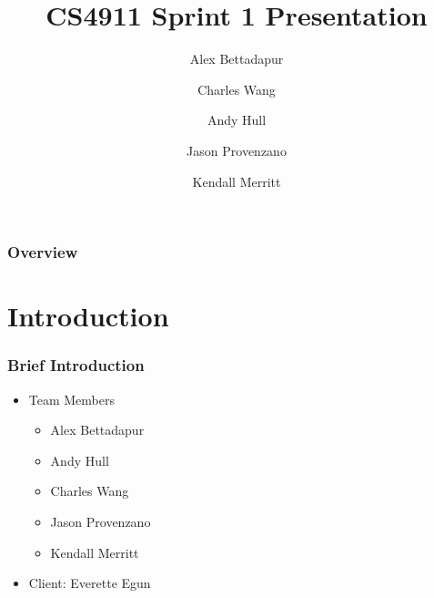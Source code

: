 \documentclass{beamer}
\title[Stocks Project]{CS4911 Sprint 1 Presentation} %
\author{Alex Bettadapur\and Charles  Wang\and Andy Hull\and Jason Provenzano\and Kendall Merritt} %
\begin{document}
\begin{frame}
\titlepage %
\end{frame}

\begin{frame}
\frametitle{Overview} %
\tableofcontents %
\end{frame}


\section{Introduction} %


\begin{frame}
\frametitle{Brief Introduction}
\begin{itemize}
\item Team Members
\begin{itemize}
\item Alex Bettadapur
\item Andy Hull
\item Charles Wang
\item Jason Provenzano
\item Kendall Merritt
\end{itemize}
\item Client: Everette Egun
\end{itemize}
\end{frame}
\end{document}
